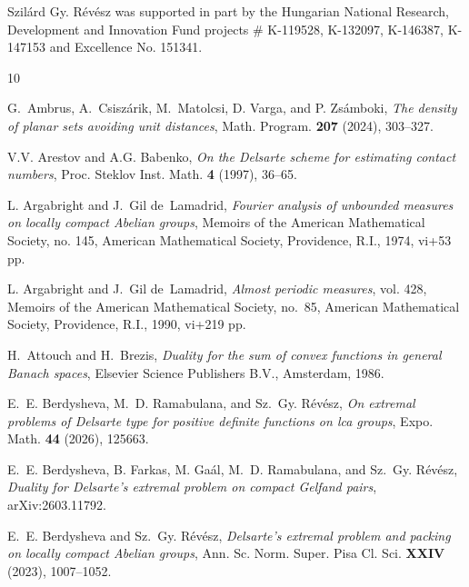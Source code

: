 \documentclass[[a4paper,english,12pt]{amsart}
\theoremstyle{plain}
\theoremstyle{remark}
\begin{document}
Szil\'ard Gy. Révész was supported in part by the Hungarian National Research, Development and Innovation Fund projects \# K-119528, K-132097, K-146387, K-147153 and Excellence No.
151341.
% 
%



\begin{thebibliography}{10}



 G.~Ambrus, A.~Csisz\'arik, M.~Matolcsi, D. Varga, and P. Zs\'amboki,
\emph{The density of planar sets avoiding unit distances},
Math. Program. \textbf{207} (2024), 303--327.



V.V. Arestov and A.G. Babenko, \emph{On the {D}elsarte scheme for estimating
  contact numbers}, Proc. Steklov Inst. Math. \textbf{4} (1997), 36--65.

L. Argabright and J.~Gil de~Lamadrid, \emph{Fourier analysis of unbounded
  measures on locally compact {A}belian groups}, Memoirs of the American
  Mathematical Society, no. 145, American Mathematical Society, Providence,
  R.I., 1974, vi+53 pp.

L. Argabright and J.~Gil de~Lamadrid, \emph{Almost periodic measures}, vol. 428, Memoirs of the American
  Mathematical Society, no.~85, American Mathematical Society, Providence,
  R.I., 1990, vi+219 pp.

H.~Attouch and H.~Brezis, \emph{Duality for the sum of convex functions in
  general {B}anach spaces}, Elsevier Science Publishers B.V., Amsterdam, 1986.

E.~E. Berdysheva, M.~D. Ramabulana, and Sz.~Gy. R\'ev\'esz, \emph{On extremal
  problems of {D}elsarte type for positive definite functions on lca groups},
  Expo. Math. \textbf{44} (2026), 125663.

E.~E. Berdysheva, B.{} Farkas, M.{} Ga\'al, M.~D. Ramabulana, and Sz.~Gy. R\'ev\'esz,
\emph{Duality for Delsarte's extremal problem on compact {G}elfand pairs}, arXiv:2603.11792.


E.~E. Berdysheva and Sz.~Gy. Révész, \emph{{D}elsarte's extremal problem and
  packing on locally compact {A}belian groups}, Ann. Sc. Norm. Super. Pisa Cl.
  Sci. \textbf{XXIV} (2023), 1007--1052.



\end{thebibliography}
\end{document}
